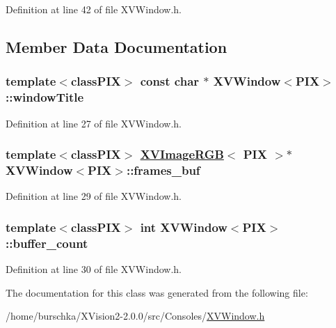 Definition at line 42 of file XVWindow.h.

\subsection{Member Data Documentation}
\label{XVWindow_n0}
\hypertarget{class_XVWindow_n0}{
\subsubsection[windowTitle]{\setlength{\rightskip}{0pt plus 5cm}template$<$classPIX$>$ const char $\ast$ XVWindow$<$PIX$>$::window\-Title}}




Definition at line 27 of file XVWindow.h.\label{XVWindow_n1}
\hypertarget{class_XVWindow_n1}{
\subsubsection[frames_buf]{\setlength{\rightskip}{0pt plus 5cm}template$<$classPIX$>$ \hyperlink{class_XVImageRGB}{XVImage\-RGB}$<$ PIX $>$$\ast$ XVWindow$<$PIX$>$::frames\_\-buf}}




Definition at line 29 of file XVWindow.h.\label{XVWindow_n2}
\hypertarget{class_XVWindow_n2}{
\subsubsection[buffer_count]{\setlength{\rightskip}{0pt plus 5cm}template$<$classPIX$>$ int XVWindow$<$PIX$>$::buffer\_\-count}}




Definition at line 30 of file XVWindow.h.

The documentation for this class was generated from the following file:\begin{CompactItemize}
\item 
/home/burschka/XVision2-2.0.0/src/Consoles/\hyperlink{XVWindow.h-source}{XVWindow.h}\end{CompactItemize}
